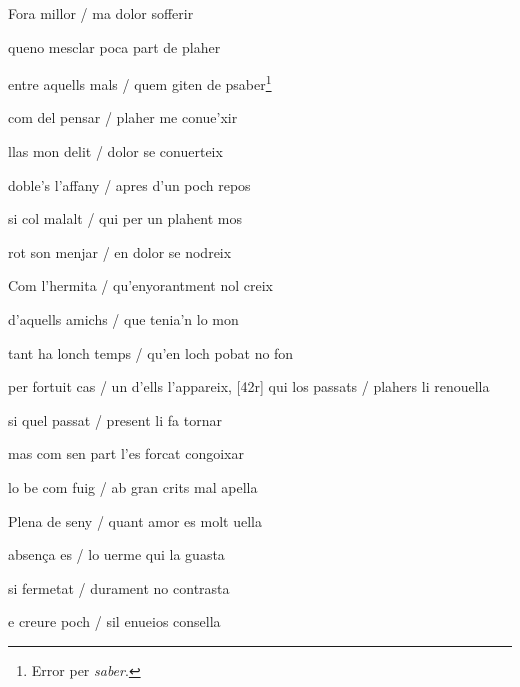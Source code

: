 \begin{estrofa}

 Fora millor / ma dolor sofferir

 queno mesclar poca part de plaher

 entre aquells mals / quem giten de psaber\footnote{Error per \textit{saber}.}

 com del pensar / plaher me conue'xir

 llas mon delit / dolor se conuerteix

 doble's l'affany / apres d'un poch repos

 si col malalt / qui per un plahent mos

 rot son menjar / en dolor se nodreix

\end{estrofa}



\begin{estrofa}

 Com l'hermita / qu'enyorantment nol creix

 d'aquells amichs / que tenia'n lo mon

 tant ha lonch temps / qu'en loch pobat no fon

 per fortuit cas / un d'ells l'appareix,
[42r]
 qui los passats / plahers li renouella

 si quel passat / present li fa tornar

 mas com sen part l'es forcat congoixar

 lo be com fuig / ab gran crits mal apella

\end{estrofa}



\begin{tornada}

 Plena de seny / quant amor es molt uella

 absen\c{c}a es / lo uerme qui la guasta

 si fermetat / durament no contrasta

 e creure poch / sil enueios consella

\end{tornada}




